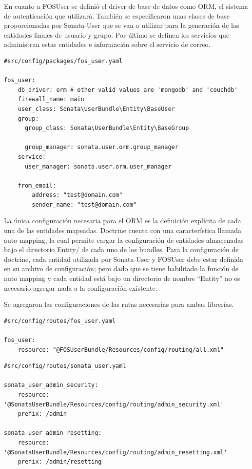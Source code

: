 En cuanto a FOSUser se definió el driver de base de datos como ORM, el sistema de autenticación que utilizará\@. También se especificaron unas clases de base
proporcionadas por Sonata-User que se van a utilizar para la generación de las entidades finales de usuario y grupo\@. Por último se definen los servicios
que administran estas entidades e información sobre el servicio de correo.

\begin{lstlisting}[caption=archivo de configuración de FOSUser]
#src/config/packages/fos_user.yaml

fos_user:
    db_driver: orm # other valid values are 'mongodb' and 'couchdb'
    firewall_name: main
    user_class: Sonata\UserBundle\Entity\BaseUser
    group:
      group_class: Sonata\UserBundle\Entity\BaseGroup

      group_manager: sonata.user.orm.group_manager
    service:
      user_manager: sonata.user.orm.user_manager

    from_email:
        address: "test@domain.com"
        sender_name: "test@domain.com"

\end{lstlisting}



La única configuración necesaria para el ORM es la definición explícita de cada una de las entidades mapeadas.
Doctrine cuenta con una característica llamada auto mapping, la cual permite cargar la configuración de entidades almacenadas bajo el directorio Entity/
de cada uno de los bundles.
Para la configuración de doctrine, cada entidad utilizada por Sonata-User y FOSUser debe estar definida en su archivo de configuración; pero dado que se
tiene habilitado la función de auto mapping y cada entidad está bajo un directorio de nombre “Entity” no es necesario agregar nada a la configuración existente.



Se agregaron las configuraciones de las rutas necesarias para ambas librerías.



\begin{lstlisting}[caption=archivo de configuración de rutas de FOSUser]
#src/config/routes/fos_user.yaml

fos_user:
    resource: "@FOSUserBundle/Resources/config/routing/all.xml"
\end{lstlisting}

\begin{lstlisting}[caption=archivo de configuración de rutas de sonata-user]
#src/config/routes/sonata_user.yaml

sonata_user_admin_security:
    resource: '@SonataUserBundle/Resources/config/routing/admin_security.xml'
    prefix: /admin

sonata_user_admin_resetting:
    resource: '@SonataUserBundle/Resources/config/routing/admin_resetting.xml'
    prefix: /admin/resetting

\end{lstlisting}

